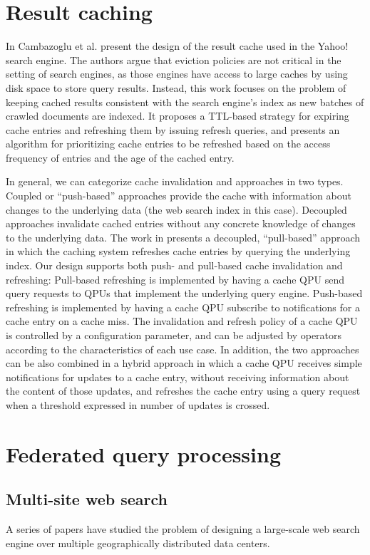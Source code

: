 \section{Result caching}
\label{sec:related_caching}
In \cite{cambazoglu:yahoorefreshing} Cambazoglu et al. present the design of the result cache used
in the Yahoo! search engine.
The authors argue that eviction policies are not critical in the setting of search engines, as those engines have access
to large caches by using disk space to store query results.
Instead, this work focuses on the problem of keeping cached results consistent with the search engine’s index
as new batches of crawled documents are indexed.
It proposes a TTL-based strategy for expiring cache entries and refreshing them by issuing refresh queries,
and presents an algorithm for prioritizing cache entries to be refreshed based on the access frequency of entries and
the age of the cached entry.

In general, we can categorize cache invalidation and approaches in two types.
Coupled or ``push-based'' approaches provide the cache with information about changes to the underlying data
(the web search index in this case).
Decoupled approaches invalidate cached entries without any concrete knowledge of changes to the underlying data.
The work in \cite{cambazoglu:yahoorefreshing} presents a decoupled,
``pull-based'' approach in which the caching system refreshes cache entries by querying the underlying index.
Our design supports both push- and pull-based cache invalidation and refreshing:
Pull-based refreshing is implemented by having a cache QPU send query requests to QPUs that implement the underlying
query engine.
Push-based refreshing is implemented by having a cache QPU subscribe to notifications for a cache entry on a cache
miss.
The invalidation and refresh policy of a cache QPU is controlled by a configuration parameter,
and can be adjusted by operators according to the characteristics of each use case.
In addition, the two approaches can be also combined in a hybrid approach in which a cache QPU receives simple notifications
for updates to a cache entry, without receiving information about the content of those updates,
and refreshes the cache entry using a query request when a threshold expressed in number of updates is crossed.

\section{Federated query processing}
\label{sec:federation}
\subsection{Multi-site web search}
A series of papers \cite{cambazoglu:multisitequantifying, yates:multisitefeasibility, cambazoglu:multisiteforwarding, frances:multisiteefficiency, kayaaslan:multisitereplication}
have studied the problem of designing a large-scale web search engine over multiple geographically distributed data centers.


